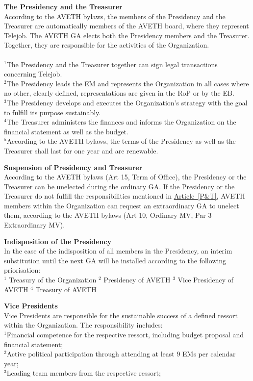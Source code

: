 \documentclass[10pt]{article}
\newcounter{qcounter}
\begin{document}
\begin{list}{{\bf Article :~}}{}
\item {\bf The Presidency and the Treasurer}\label{P&T}\\
According to the AVETH bylaws, the members of the Presidency and the Treasurer are automatically members of the AVETH board, where they represent Telejob. The AVETH GA elects both the Presidency members and the Treasurer. Together, they are responsible for the activities of the Organization. \\\\
$^{1}$The Presidency and the Treasurer together can sign legal transactions concerning Telejob.\\
$^{2}$The Presidency leads the EM and represents the Organization in all cases where no other, clearly defined, representations are given in the RoP or by the EB. \\
$^{3}$The Presidency develops and executes the Organization's strategy with the goal to fulfill its purpose sustainably.\\
$^{4}$The Treasurer administers the finances and informs the Organization on the financial statement as well as the budget.\\
$^{5}$According to the AVETH bylaws, the terms of the Presidency as well as the Treasurer shall last for one year and are renewable.

\item {\bf Suspension of Presidency and Treasurer}\label{suspension}\\
According to the AVETH bylaws (Art 15, Term of Office), the Presidency or the Treasurer can be unelected during the ordinary GA. If the Presidency or the Treasurer do not fulfill the responsibilities mentioned in \hyperref[P&T]{Article~\ref{P&T}}, AVETH members within the Organization can request an extraordinary GA to unelect them, according to the AVETH bylaws (Art 10, Ordinary MV, Par 3 Extraordinary MV).

\item {\bf Indisposition of the Presidency}\\
In the case of the indisposition of all members in the Presidency, an interim substitution until the next GA will be installed according to the following priorisation:\\
$^{1}$ Treasury of the Organization
$^{2}$ Presidency of AVETH
$^{3}$ Vice Presidency of AVETH
$^{4}$ Treasury of AVETH


\item {\bf Vice Presidents}\\\label{VP&D}
Vice Presidents are responsible for the sustainable success of a defined ressort within the Organization. The responsibility includes:\\
$^{1}$Financial competence for the respective ressort, including budget proposal and financial statement;\\ 
$^{2}$Active political participation through attending at least 9 EMs per calendar year;\\
$^{3}$Leading team members from the respective ressort;\\


\end{list}
\end{document}
